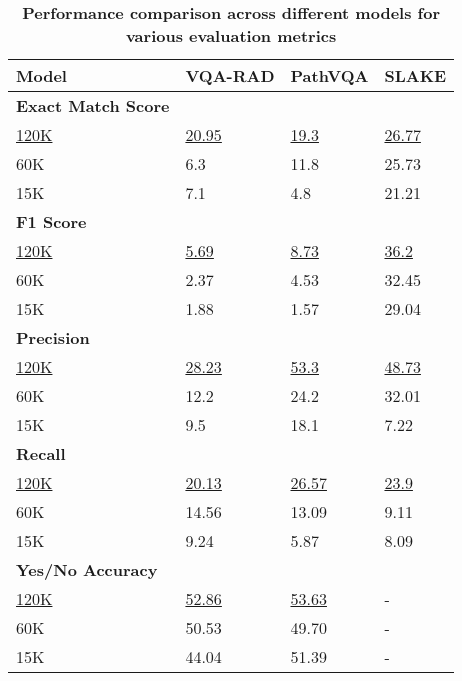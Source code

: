 \documentclass[10pt,letterpaper]{article}
\begin{document}
\begin{table}[ht]
    \centering
    \caption{\bf Performance comparison across different models for various evaluation metrics}
    \begin{tabular}{@{}l|l|l|l@{}}
        \toprule
        \textbf{Model} & \textbf{VQA-RAD} & \textbf{PathVQA} & \textbf{SLAKE} \\
        \midrule
        \textbf{Exact Match Score} \\
        \midrule
        \underline{120K} & \underline{20.95} & \underline{19.3} & \underline{26.77} \\
        \hline
        60K & 6.3 & 11.8 & 25.73 \\
        \hline
        15K & 7.1 & 4.8 & 21.21 \\
        \hline
        \textbf{F1 Score} \\
        \midrule
        \underline{120K} & \underline{5.69} & \underline{8.73} & \underline{36.2} \\
        \hline
        60K & 2.37 & 4.53 & 32.45 \\
        \hline
        15K & 1.88 & 1.57 & 29.04 \\
        \hline
        \textbf{Precision} \\
        \midrule
        \underline{120K} & \underline{28.23} & \underline{53.3} & \underline{48.73} \\
        \hline
        60K & 12.2 & 24.2 & 32.01 \\
        \hline
        15K & 9.5 & 18.1 & 7.22 \\
        \hline
        \textbf{Recall} \\
        \midrule
        \underline{120K} & \underline{20.13} & \underline{26.57} & \underline{23.9} \\
        \hline
        60K & 14.56 & 13.09 & 9.11 \\
        \hline
        15K & 9.24 & 5.87 & 8.09 \\
        \hline
        \textbf{Yes/No Accuracy} \\
        \hline
        \underline{120K} & \underline{52.86} & \underline{53.63} & - \\
        \hline
        60K & 50.53 & 49.70 & - \\
        \hline
        15K & 44.04 & 51.39 & - \\
        \hline
    \end{tabular}
    \label{tab:6}
\end{table}
\end{document}
